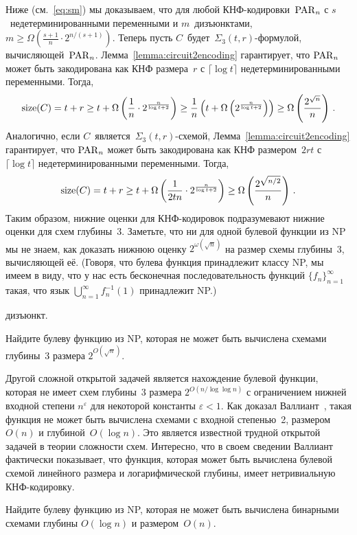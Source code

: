 Ниже (см.~\eqref{eq:sm}) мы доказываем, что для любой КНФ-кодировки~$\operatorname{PAR}_n$ с 
$s$~недетерминированными переменными и $m$~дизъюнктами,
$m \ge \Omega\left(\frac{s+1}{n} \cdot 2^{n/(s+1)}\right)$.
Теперь пусть $C$~будет~$\Sigma_3(t,r)$-формулой, вычисляющей~$\operatorname{PAR}_n$.
Лемма~\ref{lemma:circuit2encoding} гарантирует, что $\operatorname{PAR}_n$ может быть закодирована как КНФ размера~$r$ с $\lceil \log t \rceil$ недетерминированными переменными. Тогда,
\[\operatorname{size}(C) = t + r \ge t + \Omega \left( \frac{1}{n}\cdot 2^{\frac{n}{\log t + 2}} \right) \ge \frac 1n \left( t + \Omega\left( 2^{\frac{n}{\log t + 2}}\right)\right) \ge \Omega\left(\frac{2^{\sqrt{n}}}{n}\right) \, .\]
Аналогично, если $C$~является~$\Sigma_3(t,r)$-схемой, Лемма~\ref{lemma:circuit2encoding} гарантирует, что $\operatorname{PAR}_n$ может быть закодирована как КНФ размером~$2rt$ с $\lceil \log t \rceil$ недетерминированными переменными. Тогда,
\[\operatorname{size}(C) = t + r \ge t + \Omega \left( \frac{1}{2tn}\cdot 2^{\frac{n}{\log t + 2}} \right) \ge \Omega\left(\frac{2^{\sqrt{n/2}}}{n}\right) \, .\]
Таким образом, нижние оценки для КНФ-кодировок подразумевают нижние оценки
для схем глубины~3.
Заметьте, что ни для одной булевой функции из NP мы не знаем,
как доказать нижнюю оценку $2^{\omega(\sqrt{n})}$
на размер схемы глубины~3, вычисляющей её.
(Говоря, что булева функция принадлежит классу NP, мы имеем в виду, что у нас есть бесконечная последовательность функций $\{f_n\}_{n=1}^{\infty}$ такая, что язык $\bigcup_{n=1}^{\infty}f^{-1}_n(1)$ принадлежит NP.)

дизъюнкт. 

\begin{openproblem}
	\label{open:sqrtn}
	Найдите булеву функцию из NP, которая не может 
	быть вычислена схемами глубины~3 размера $2^{O(\sqrt n)}$.
\end{openproblem}

Другой сложной открытой задачей является нахождение 
булевой функции, которая не имеет схем глубины~3 
размера $2^{O(n/\log \log n)}$ с ограничением нижней входной степени $n^{\varepsilon}$ для некоторой константы $\varepsilon<1$.
Как доказал Валлиант~\cite{Valiant1977GraphTheoreticAI},
такая функция не может быть вычислена схемами с входной степенью~2, размером~$O(n)$ и глубиной~$O(\log n)$. 
Это является известной трудной открытой задачей в теории сложности схем.
Интересно, что в своем сведении Валлиант фактически 
показывает, что функция, которая может быть вычислена булевой схемой линейного размера
и логарифмической глубины, имеет нетривиальную
КНФ-кодировку.

\begin{openproblem}
	\label{open:nloglogn}
	Найдите булеву функцию из NP, которая не может 
	быть вычислена бинарными схемами глубины $O(\log n)$
	и размером~$O(n)$.
\end{openproblem}


